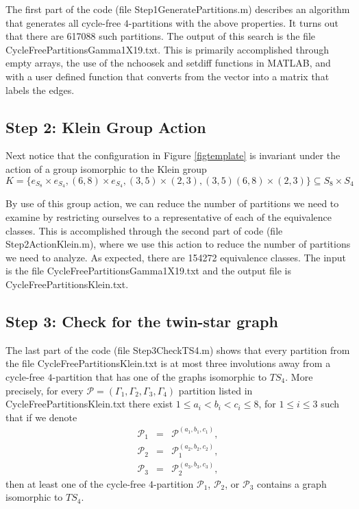 \documentclass[reqno,11pt]{amsart}
\theoremstyle{definition}
\theoremstyle{remark}
\numberwithin{equation}{section}
\begin{document}
The first part of the code (file {\ttfamily Step1GeneratePartitions.m}) describes an algorithm that generates all cycle-free $4$-partitions with the above properties.  It turns out that there are \num{617088} such partitions.  The output of this search is the file {\ttfamily CycleFreePartitionsGamma1X19.txt}. This is primarily accomplished through empty arrays, the use of the nchoosek and setdiff functions in MATLAB, and with a user defined function that converts from the vector into a matrix that labels the edges.

\subsection{Step 2: Klein Group Action}


Next notice that the configuration in Figure \ref{figtemplate} is invariant under the action of a group isomorphic to the Klein group
$$K=\{e_{S_8}\times e_{S_4}, (6,8)\times e_{S_4}, (3,5)\times (2,3), (3,5)(6,8)\times (2,3)\}\subseteq S_8\times S_4$$

By use of this group action, we can reduce the number of partitions we need to examine by restricting ourselves to a representative of each of the equivalence classes. This is accomplished through the second part of code (file {\ttfamily Step2ActionKlein.m}), where we use this action to reduce the number of partitions we need to analyze. As expected, there are \num{154272} equivalence classes. The input is the file {\ttfamily CycleFreePartitionsGamma1X19.txt} and the output file is {\ttfamily CycleFreePartitionsKlein.txt}. 

\subsection{Step 3: Check for the twin-star graph}

The last part of the code (file {\ttfamily Step3CheckTS4.m}) shows that every partition from the file {\ttfamily CycleFreePartitionsKlein.txt} is at most three involutions away from a cycle-free $4$-partition that has one of the graphs isomorphic to $TS_4$. More precisely, for every $\mathcal{P}=(\Gamma_1, \Gamma_2, \Gamma_3,\Gamma_4)$ partition listed in {\ttfamily CycleFreePartitionsKlein.txt} there exist $1\leq a_i<b_i<c_i\leq 8$, for $1\leq i\leq 3$ such that if we denote 
\begin{eqnarray*}
\mathcal{P}_1&=&\mathcal{P}^{(a_1,b_1,c_1)},\\
\mathcal{P}_2&=&\mathcal{P}_1^{(a_2,b_2,c_2)},\\
\mathcal{P}_3&=&\mathcal{P}_2^{(a_3,b_3,c_3)},
\end{eqnarray*} 
then at least one of the cycle-free $4$-partition $\mathcal{P}_1$, $\mathcal{P}_2$,  or $\mathcal{P}_3$ contains a graph isomorphic to 
$TS_4$. 
\end{document}
